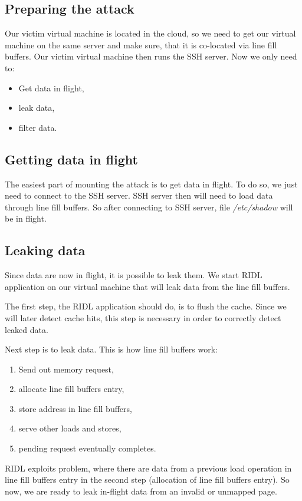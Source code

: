 \documentclass[11pt,a4paper,titlepage]{article}
\begin{document}
        \subsection{Preparing the attack}
            Our victim virtual machine is located in the cloud, so we need to get our virtual machine on the same server and make sure, that it is co-located via line fill buffers. Our victim virtual machine then runs the SSH server. Now we only need to:
            \begin{itemize}
                \item Get data in flight,
                \item leak data,
                \item filter data.
            \end{itemize}
        
        \subsection{Getting data in flight}
            The easiest part of mounting the attack is to get data in flight. To do so, we just need to connect to the SSH server. SSH server then will need to load data through line fill buffers. So after connecting to SSH server, file \textit{/etc/shadow} will be in flight.
            
        \subsection{Leaking data}
            Since data are now in flight, it is possible to leak them. We start RIDL application on our virtual machine that will leak data from the line fill buffers.
                    
            The first step, the RIDL application should do, is to flush the cache. Since we will later detect cache hits, this step is necessary in order to correctly detect leaked data.

            Next step is to leak data. This is how line fill buffers work:
            \begin{enumerate}
                \item Send out memory request,
                \item allocate line fill buffers entry,
                \item store address in line fill buffers,
                \item serve other loads and stores,
                \item pending request eventually completes.
            \end{enumerate}
            RIDL exploits problem, where there are data from a previous load operation in line fill buffers entry in the second step (allocation of line fill buffers entry). So now, we are ready to leak in-flight data from an invalid or unmapped page.
            
\end{document}
